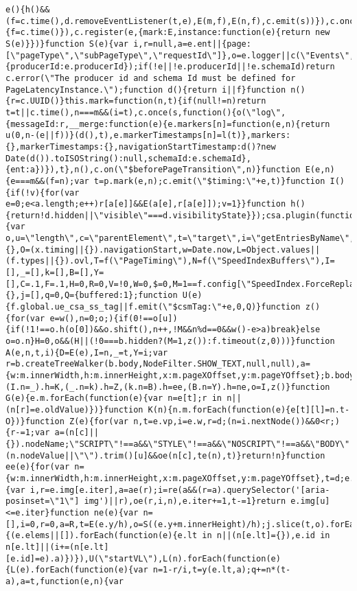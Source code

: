 \documentclass[
]{article}
\begin{document}
\begin{verbatim}
e(){h()&&(f=c.time(),d.removeEventListener(t,e),E(m,f),E(n,f),c.emit(s))}),c.once(\"$unload\",I),c.once(\"$load\",I),c.on(\"$pageTransition\",function(){f=c.time()}),c.register(e,{mark:E,instance:function(e){return new S(e)}})}function S(e){var i,r=null,a=e.ent||{page:[\"pageType\",\"subPageType\",\"requestId\"]},o=e.logger||c(\"Events\",{producerId:e.producerId});if(!e||!e.producerId||!e.schemaId)return c.error(\"The producer id and schema Id must be defined for PageLatencyInstance.\");function d(){return i||f}function n(){r=c.UUID()}this.mark=function(n,t){if(null!=n)return t=t||c.time(),n===m&&(i=t),c.once(s,function(){o(\"log\",{messageId:r,__merge:function(e){e.markers[n]=function(e,n){return u(0,n-(e||f))}(d(),t),e.markerTimestamps[n]=l(t)},markers:{},markerTimestamps:{},navigationStartTimestamp:d()?new Date(d()).toISOString():null,schemaId:e.schemaId},{ent:a})}),t},n(),c.on(\"$beforePageTransition\",n)}function E(e,n){e===m&&(f=n);var t=p.mark(e,n);c.emit(\"$timing:\"+e,t)}function I(){if(!v){for(var e=0;e<a.length;e++)r[a[e]]&&E(a[e],r[a[e]]);v=1}}function h(){return!d.hidden||\"visible\"===d.visibilityState}});csa.plugin(function(f){var o,u=\"length\",c=\"parentElement\",t=\"target\",i=\"getEntriesByName\",e=\"perf\",n=null,r=\"_osrc\",l=\"_elt\",s=\"_eid\",d=10,a=5,g=10,h=100,m=f.global,p=f.timeout,v=m.Math,y=v.max,E=v.floor,S=v.ceil,b=m.document,x=m.performance||{},O=(x.timing||{}).navigationStart,w=Date.now,L=Object.values||(f.types||{}).ovl,T=f(\"PageTiming\"),N=f(\"SpeedIndexBuffers\"),I=[],_=[],k=[],B=[],Y=[],C=.1,F=.1,H=0,R=0,V=!0,W=0,$=0,M=1==f.config[\"SpeedIndex.ForceReplay\"],P=0,X=1,D=0,J={},j=[],q=0,Q={buffered:1};function U(e){f.global.ue_csa_ss_tag||f.emit(\"$csmTag:\"+e,0,Q)}function z(){for(var e=w(),n=0;o;){if(0!==o[u]){if(!1!==o.h(o[0])&&o.shift(),n++,!M&&n%d==0&&w()-e>a)break}else o=o.n}H=0,o&&(H||(!0===b.hidden?(M=1,z()):f.timeout(z,0)))}function A(e,n,t,i){D=E(e),I=n,_=t,Y=i;var r=b.createTreeWalker(b.body,NodeFilter.SHOW_TEXT,null,null),a={w:m.innerWidth,h:m.innerHeight,x:m.pageXOffset,y:m.pageYOffset};b.body[l]=e,k.push({w:r,vp:a}),B.push({img:b.images,iter:0}),I.h=G,(I.n=_).h=K,(_.n=k).h=Z,(k.n=B).h=ee,(B.n=Y).h=ne,o=I,z()}function G(e){e.m.forEach(function(e){var n=e[t];r in n||(n[r]=e.oldValue)})}function K(n){n.m.forEach(function(e){e[t][l]=n.t-O})}function Z(e){for(var n,t=e.vp,i=e.w,r=d;(n=i.nextNode())&&0<r;){r-=1;var a=(n[c]||{}).nodeName;\"SCRIPT\"!==a&&\"STYLE\"!==a&&\"NOSCRIPT\"!==a&&\"BODY\"!==a&&0!==(n.nodeValue||\"\").trim()[u]&&oe(n[c],te(n),t)}return!n}function ee(e){for(var n={w:m.innerWidth,h:m.innerHeight,x:m.pageXOffset,y:m.pageYOffset},t=d;e.iter<e.img[u]&&0<t;){var i,r=e.img[e.iter],a=ae(r);i=re(a&&(r=a).querySelector('[aria-posinset=\"1\"] img')||r),oe(r,i,n),e.iter+=1,t-=1}return e.img[u]<=e.iter}function ne(e){var n=[],i=0,r=0,a=R,t=E(e.y/h),o=S((e.y+m.innerHeight)/h);j.slice(t,o).forEach(function(e){(e.elems||[]).forEach(function(e){e.lt in n||(n[e.lt]={}),e.id in n[e.lt]||(i+=(n[e.lt][e.id]=e).a)})}),U(\"startVL\"),L(n).forEach(function(e){L(e).forEach(function(e){var n=1-r/i,t=y(e.lt,a);q+=n*(t-a),a=t,function(e,n){var 
\end{verbatim}
\end{document}

